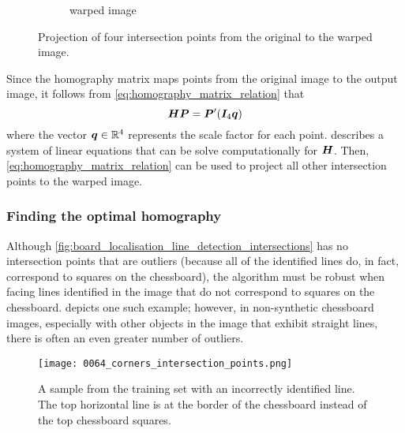 \documentclass[../report.tex]{subfiles}
\begin{document}
\begin{figure}
\begin{subfigure}[t]{0.38\textwidth}
        \caption{warped image}
    \end{subfigure}
    \caption{Projection of four intersection points from the original to the warped image.}
    \label{fig:homography_illustration}
\end{figure}%
Since the homography matrix maps points from the original image to the output image, it follows from \cref{eq:homography_matrix_relation} that
\begin{equation}
    \label{eq:homography_matrix_relation_corners}
    {\bm{H}} {\bm{P}} = {\bm{P}}' ({\bm{I}}_4 {\bm{q}})
\end{equation}
where the vector ${\bm{q}} \in \mathbb{R}^4$ represents the scale factor for each point.
 describes a system of linear equations that can be solve computationally for ${\bm{H}}$.
Then, \cref{eq:homography_matrix_relation} can be used to project all other intersection points to the warped image.

\subsubsection{Finding the optimal homography}
\label{sec:find_optimal_homography}
Although \cref{fig:board_localisation_line_detection_intersections} has no intersection points that are outliers (because all of the identified lines do, in fact, correspond to squares on the chessboard), the algorithm must be robust when facing lines identified in the image that do not correspond to squares on the chessboard.
 depicts one such example; however, in non-synthetic chessboard images, especially with other objects in the image that exhibit straight lines, there is often an even greater number of outliers. 
\begin{figure}
    \centering
    \texttt{[image: 0064\_corners\_intersection\_points.png]}    
    \caption[A sample from the training set with an incorrectly identified line.]{A sample from the training set with an incorrectly identified line. The top horizontal line is at the border of the chessboard instead of the top chessboard squares.}
    \label{fig:incorrect_intersection_points}
\end{figure}
\end{document}
